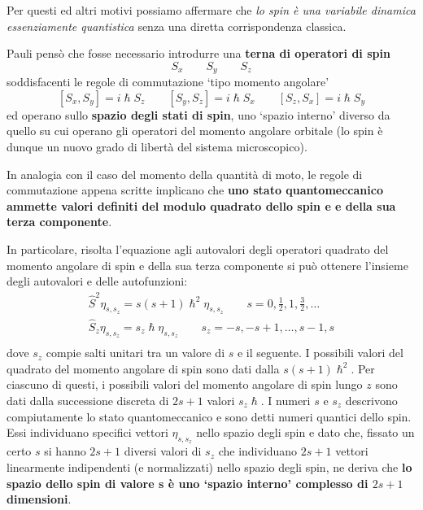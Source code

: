 Per questi ed altri motivi possiamo affermare che \emph{lo spin è una
variabile dinamica essenziamente quantistica} senza una diretta
corrispondenza classica.

Pauli pensò che fosse necessario introdurre una \textbf{terna di
operatori di spin} \[
                       S_{x} \qquad S_{y} \qquad S_{z}
\] soddisfacenti le regole di commutazione `tipo momento angolare' \[
                                                                       [ S_{x},S_{y}] = i \hslash S_{z} \qquad  [ S_{y},S_{z}] = i \hslash S_{x} \qquad   [ S_{z},S_{x}] = i \hslash S_{y}
\] ed operano sullo \textbf{spazio degli stati di spin}, uno `spazio
interno' diverso da quello su cui operano gli operatori del momento
angolare orbitale (lo spin è dunque un nuovo grado di libertà del
sistema microscopico).

In analogia con il caso del momento della quantità di moto, le regole di
commutazione appena scritte implicano che \textbf{uno stato
quantomeccanico ammette valori definiti del modulo quadrato dello spin e
e della sua terza componente}.

In particolare, risolta l'equazione agli autovalori degli operatori
quadrato del momento angolare di spin e della sua terza componente si
può ottenere l'insieme degli autovalori e delle autofunzioni: \begin{gather*}
    \hat{S}^{2} \eta_{s,s_{z}} = s (s+1) \hslash^{2} \eta_{s,s_{z}} \qquad s = 0, \frac{1}{2}, 1, \frac{3}{2}, \dots\\
    \hat{S}_{z} \eta_{s,s_{z}} = s_{z} \hslash \eta_{s,s_{z}} \qquad s_{z} = -s, -s+1, \dots , s-1, s\\
\end{gather*} dove \(s_{z}\) compie salti unitari tra un valore di \(s\) e il
seguente.
I possibili valori del quadrato del momento angolare di spin
sono dati dalla \(s(s+1)\hslash^{2}\).
Per ciascuno di questi, i
possibili valori del momento angolare di spin lungo \(z\) sono dati
dalla successione discreta di \(2s+1\) valori \(s_{z} \hslash\).
I
numeri \(s\) e \(s_{z}\) descrivono compiutamente lo stato
quantomeccanico e sono detti numeri quantici dello spin.
Essi
individuano specifici vettori \(\eta_{s,s_{z}}\) nello spazio degli spin
e dato che, fissato un certo \(s\) si hanno \(2s+1\) diversi valori di
\(s_{z}\) che individuano \(2s+1\) vettori linearmente indipendenti (e
normalizzati) nello spazio degli spin, ne deriva che \textbf{lo spazio
dello spin di valore s è uno `spazio interno' complesso di \(2s+1\)
    dimensioni}.

